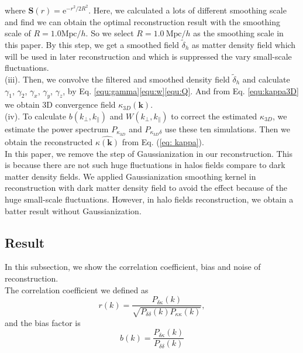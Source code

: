 where $\mathbf{S}(r)=\mathrm{e}^{-r^{2}/2R^{2}}$. Here, we calculated a lots
of different smoothing scale and find we can obtain the optimal 
reconstruction result with the smoothing scale of $R=1.0\mathrm{Mpc}/h$. 
So we select $R=1.0\ \mathrm{Mpc}/h$
as the smoothing scale in this paper. By this step, we get a smoothed
field $\tilde{\delta}_{h}$ as matter density field which will be used in 
later reconstruction and which is suppressed the vary small-scale 
fluctuations.\\
(iii). Then, we convolve the filtered and smoothed density field 
$\tilde{\delta}_{h}$ and calculate $\gamma_1$, $\gamma_2$, $\gamma_x$,
$\gamma_y$, $\gamma_z$, by 
Eq. \eqref{equ:gamma}\eqref{equ:w}\eqref{equ:Q}. And from
Eq. \eqref{equ:kappa3D} we obtain 3D convergence field 
$\kappa_{3D}(\mathbf{k})$.\\
(iv). To calculate $b(k_{\perp},k_{\parallel})$ and
 $W(k_{\perp},k_{\parallel})$ to correct the estimated $\kappa_{3D}$, we 
 estimate the power spectrum $P_{\kappa_{3D}}$ and $P_{\kappa_{3D}\delta}$ use 
 these ten simulations. Then we obtain the reconstructed 
 $\hat{\kappa(\mathbf{k})}$ from Eq. (\ref{eq: kappa}).\\
 
 In this paper, we remove the step of Gaussianization in our reconstruction.
 This is because there are not such huge fluctuations in halos fields 
 compare to dark matter density fields. We applied Gaussianization smoothing
 kernel in reconstruction with dark matter density field to avoid the effect
 because of the huge small-scale fluctuations. However, in halo fields 
 reconstruction, we obtain a batter result without Gaussianization.\\
\subsection{Result}
In this subsection, we show the correlation coefficient, bias and noise of 
reconstruction.\\

The correlation coefficient we defined as 
\begin{equation}
r(k)=\frac{P_{\delta\kappa}(k)}{\sqrt{P_{\delta \delta}(k)P_{\kappa \kappa}(k)}},
\label{equ:r}
\end{equation}
and the bias factor is 
\begin{equation}
b(k)=\frac{P_{\delta \kappa}(k)}{P_{\delta \delta}(k)}
\label{equ:bias}
\end{equation}

